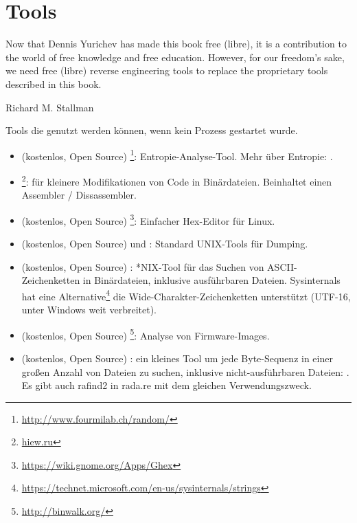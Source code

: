 \chapter{Tools}

\epigraph{Now that Dennis Yurichev has made this book free (libre), it is a
contribution to the world of free knowledge and free education.
However, for our freedom's sake, we need free (libre) reverse
engineering tools to replace the proprietary tools described in this book.}{Richard M. Stallman}


Tools die genutzt werden können, wenn kein Prozess gestartet wurde.


\begin{itemize}
\item
(kostenlos, Open Source) \footnote{\url{http://www.fourmilab.ch/random/}}: Entropie-Analyse-Tool.
Mehr über Entropie: .

\item
\label{Hiew}
\footnote{\href{http://go.yurichev.com/17035}{hiew.ru}}:
für kleinere Modifikationen von Code in Binärdateien.
Beinhaltet einen Assembler / Dissassembler.

\item (kostenlos, Open Source) \footnote{\url{https://wiki.gnome.org/Apps/Ghex}}: Einfacher Hex-Editor für Linux.

\item (kostenlos, Open Source)  und : Standard UNIX-Tools für Dumping.

\item (kostenlos, Open Source) : *NIX-Tool für das Suchen von ASCII-Zeichenketten in Binärdateien,
inklusive ausführbaren Dateien.
Sysinternals hat eine Alternative\footnote{\url{https://technet.microsoft.com/en-us/sysinternals/strings}}
die Wide-Charakter-Zeichenketten unterstützt (UTF-16, unter Windows weit verbreitet).

\item (kostenlos, Open Source) \footnote{\url{http://binwalk.org/}}: Analyse von Firmware-Images.

\item
{}
(kostenlos, Open Source) :
ein kleines Tool um jede Byte-Sequenz in einer großen Anzahl von Dateien zu suchen,
inklusive nicht-ausführbaren Dateien: \BGREPURL.
Es gibt auch rafind2 in rada.re mit dem gleichen Verwendungszweck.
\end{itemize}

